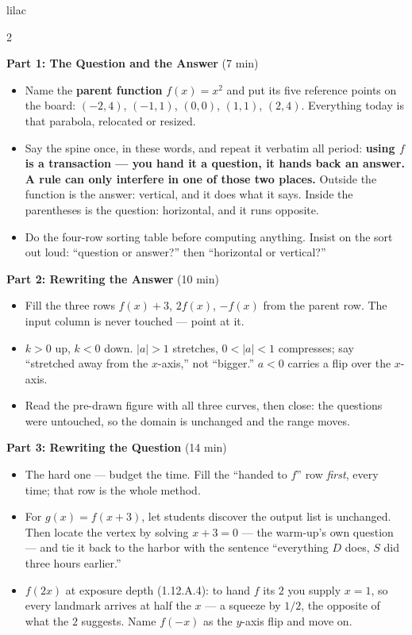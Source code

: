 \documentclass[10pt]{article}
\begin{document}
\begin{skillbox}[Lesson]{lilac}
\begin{multicols}{2}

\textbf{Part 1: The Question and the Answer} (7 min)

\begin{itemize}
  \item Name the \textbf{parent function} $f(x)=x^2$ and put its five
        reference points on the board: $(-2,4)$, $(-1,1)$, $(0,0)$, $(1,1)$,
        $(2,4)$. Everything today is that parabola, relocated or resized.
  \item Say the spine once, in these words, and repeat it verbatim all period:
        \textbf{using $f$ is a transaction --- you hand it a question, it
        hands back an answer. A rule can only interfere in one of those two
        places.} Outside the function is the answer: vertical, and it does
        what it says. Inside the parentheses is the question: horizontal, and
        it runs opposite.
  \item Do the four-row sorting table before computing anything. Insist on the
        sort out loud: ``question or answer?'' then ``horizontal or
        vertical?''
\end{itemize}

\textbf{Part 2: Rewriting the Answer} (10 min)

\begin{itemize}
  \item Fill the three rows $f(x)+3$, $2f(x)$, $-f(x)$ from the parent row.
        The input column is never touched --- point at it.
  \item $k>0$ up, $k<0$ down. $|a|>1$ stretches, $0<|a|<1$ compresses; say
        ``stretched away from the $x$-axis,'' not ``bigger.'' $a<0$ carries a
        flip over the $x$-axis.
  \item Read the pre-drawn figure with all three curves, then close: the
        questions were untouched, so the domain is unchanged and the range
        moves.
\end{itemize}

\columnbreak

\textbf{Part 3: Rewriting the Question} (14 min)

\begin{itemize}
  \item The hard one --- budget the time. Fill the ``handed to $f$'' row
        \textit{first}, every time; that row is the whole method.
  \item For $g(x)=f(x+3)$, let students discover the output list is unchanged.
        Then locate the vertex by solving $x+3=0$ --- the warm-up's own
        question --- and tie it back to the harbor with the sentence
        ``everything $D$ does, $S$ did three hours earlier.''
  \item $f(2x)$ at exposure depth (1.12.A.4): to hand $f$ its $2$ you supply
        $x=1$, so every landmark arrives at half the $x$ --- a squeeze by
        $1/2$, the opposite of what the $2$ suggests. Name $f(-x)$ as the
        $y$-axis flip and move on.
\end{itemize}


\end{multicols}
\end{skillbox}
\end{document}
